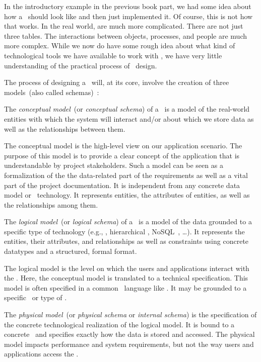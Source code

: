 %
%
In the introductory example in the previous book part, we had some idea about how a \db\ should look like and then just implemented it.
Of course, this is not how that works.
In the real world,  are much more complicated.
There are not just three tables.
The interactions between objects, processes, and people are much more complex.
While we now do have some rough idea about what kind of technological tools we have available to work with , we have very little understanding of the practical process of \db\ design.

The process of designing a \db\ will, at its core, involve the creation of three models~(also called schemas)~\cite{EN2015FODS}:%
%
\begin{definition}%
The \emph{conceptual model}~(or \emph{conceptual schema}) of a \db\ is a model of the real-world entities with which the system will interact and/or about which we store data as well as the relationships between them.%
\end{definition}%
%
The conceptual model is the high-level view on our application scenario.
The purpose of this model is to provide a clear concept of the application that is understandable by project stakeholders.
Such a model can be seen as a formalization of the the data-related part of the requirements as well as a vital part of the project documentation.
It is independent from any concrete data model or \db\ technology.
It represents entities, the attributes of entities, as well as the relationships among them.
%
\begin{definition}%
The \emph{logical model}~(or \emph{logical schema}) of a \db\ is a model of the data grounded to a specific type of technology (e.g., , hierarchical \db, NoSQL~\db, \dots). %
It represents the entities, their attributes, and relationships as well as constraints using concrete datatypes and a structured, formal format.%
\end{definition}%
%
The logical model is the level on which the users and applications interact with the \db.
Here, the conceptual model is translated to a technical specification.
This model is often specified in a common \db\ language like \sql.
It may be grounded to a specific \dbms\ or type of \dbms.%
%
\begin{definition}%
The \emph{physical model}~(or \emph{physical schema} or \emph{internal schema}) is the specification of the concrete technological realization of the logical model. %
It is bound to a concrete \dbms\ and specifies exactly how the data is stored and accessed. %
The physical model impacts performance and system requirements, but not the way users and applications access the \db.%
\end{definition}%
